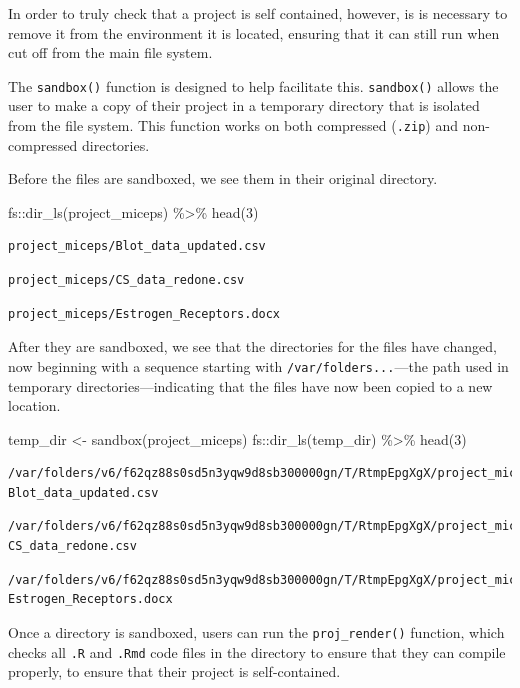 \documentclass[12pt,twoside]{reedthesis}
\newenvironment{Shaded}{\begin{snugshade}}{\end{snugshade}}
\newcommand{\DecValTok}[1]{\textcolor[rgb]{0.00,0.00,0.81}{#1}}
\newcommand{\FunctionTok}[1]{\textcolor[rgb]{0.00,0.00,0.00}{#1}}
\newcommand{\NormalTok}[1]{#1}
\newcommand{\OtherTok}[1]{\textcolor[rgb]{0.56,0.35,0.01}{#1}}
\newcommand{\SpecialCharTok}[1]{\textcolor[rgb]{0.00,0.00,0.00}{#1}}
\newcommand{\StringTok}[1]{\textcolor[rgb]{0.31,0.60,0.02}{#1}}
\begin{document}
In order to truly check that a project is self contained, however, is is necessary to remove it from the environment it is located, ensuring that it can still run when cut off from the main file system.

The \texttt{sandbox()} function is designed to help facilitate this. \texttt{sandbox()} allows the user to make a copy of their project in a temporary directory that is isolated from the file system. This function works on both compressed (\texttt{.zip}) and non-compressed directories.

Before the files are sandboxed, we see them in their original directory.
\begin{Shaded}
\begin{Highlighting}[]
\NormalTok{fs}\SpecialCharTok{::}\FunctionTok{dir\_ls}\NormalTok{(}\StringTok{\textquotesingle{}project\_miceps\textquotesingle{}}\NormalTok{) }\SpecialCharTok{\%\textgreater{}\%} \FunctionTok{head}\NormalTok{(}\DecValTok{3}\NormalTok{)}
\end{Highlighting}
\end{Shaded}
\begin{verbatim}
project_miceps/Blot_data_updated.csv 
\end{verbatim}
\begin{verbatim}
project_miceps/CS_data_redone.csv 
\end{verbatim}
\begin{verbatim}
project_miceps/Estrogen_Receptors.docx
\end{verbatim}
After they are sandboxed, we see that the directories for the files have changed, now beginning with a sequence starting with \texttt{/var/folders...}---the path used in temporary directories---indicating that the files have now been copied to a new location.
\begin{Shaded}
\begin{Highlighting}[]
\NormalTok{temp\_dir }\OtherTok{\textless{}{-}} \FunctionTok{sandbox}\NormalTok{(}\StringTok{\textquotesingle{}project\_miceps\textquotesingle{}}\NormalTok{)}
\NormalTok{fs}\SpecialCharTok{::}\FunctionTok{dir\_ls}\NormalTok{(temp\_dir) }\SpecialCharTok{\%\textgreater{}\%} \FunctionTok{head}\NormalTok{(}\DecValTok{3}\NormalTok{)}
\end{Highlighting}
\end{Shaded}
\begin{verbatim}
/var/folders/v6/f62qz88s0sd5n3yqw9d8sb300000gn/T/RtmpEpgXgX/project_miceps/
Blot_data_updated.csv 
\end{verbatim}
\begin{verbatim}
/var/folders/v6/f62qz88s0sd5n3yqw9d8sb300000gn/T/RtmpEpgXgX/project_miceps/
CS_data_redone.csv 
\end{verbatim}
\begin{verbatim}
/var/folders/v6/f62qz88s0sd5n3yqw9d8sb300000gn/T/RtmpEpgXgX/project_miceps/
Estrogen_Receptors.docx
\end{verbatim}
Once a directory is sandboxed, users can run the \texttt{proj\_render()} function, which checks all \texttt{.R} and \texttt{.Rmd} code files in the directory to ensure that they can compile properly, to ensure that their project is self-contained.
\end{document}
